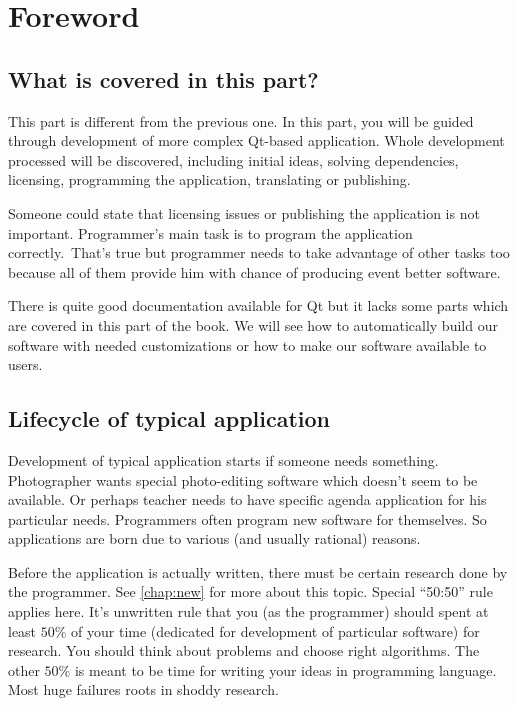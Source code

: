 \chapter{Foreword}

\section{What is covered in this part?}
This part is different from the previous one. In this part, you will be guided through development of more complex Qt-based application. Whole development processed will be discovered, including initial ideas, solving dependencies, licensing, programming the application, translating or publishing.

Someone could state that licensing issues or publishing the application is not important. Programmer's main task is to program the application correctly.\ That's true but programmer needs to take advantage of other tasks too because all of them provide him with chance of producing event better software.

There is quite good documentation \citep{various:qtdoc} available for Qt but it lacks some parts which are covered in this part of the book. We will see how to automatically build our software with needed customizations or how to make our software available to users.

\section{Lifecycle of typical application}
Development of typical application starts if someone needs something. Photographer wants special photo-editing software which doesn't seem to be available. Or perhaps teacher needs to have specific agenda application for his particular needs. Programmers often program new software for themselves. So applications are born due to various (and usually rational) reasons.

Before the application is actually written, there must be certain research done by the programmer. See \autoref{chap:new} for more about this topic. Special \enquote{50:50} rule applies here. It's unwritten rule that you (as the programmer) should spent at least $50\%$ of your time (dedicated for development of particular software) for research. You should think about problems and choose right algorithms. The other $50\%$ is meant to be time for writing your ideas in programming language. Most huge failures roots in shoddy research.

